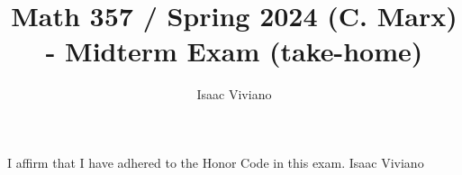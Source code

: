 \documentclass[12pt, reqno]{article}
\theoremstyle{definition}
\theoremstyle{remark}
\begin{document}
\title{Math 357 / Spring 2024 (C. Marx)  -  Midterm Exam ({\bf{take-home}})}
\date{}
\author{Isaac Viviano}  %

\maketitle

I affirm that I have adhered to the Honor Code in this exam. 
Isaac Viviano

\vspace{- 0.5 cm}







\end{document}

